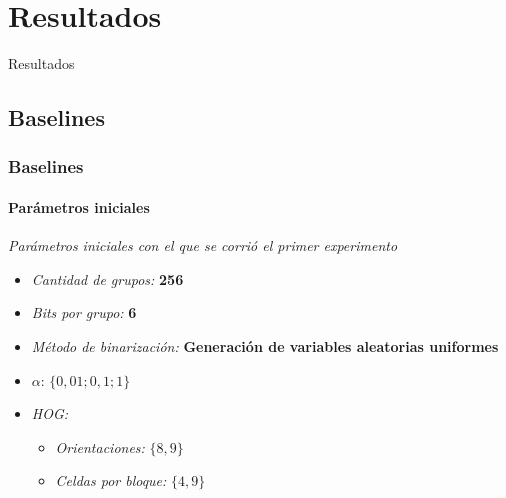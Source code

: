 \section{Resultados}
	\begin{frame}
		\begin{center}
			\begin{huge}
				{Resultados}
			\end{huge}
		\end{center}
	\end{frame}
	\subsection{Baselines}
		\begin{frame}
			\frametitle{Baselines}
			\framesubtitle{Parámetros iniciales}
			\textit{Parámetros iniciales con el que se corrió el primer experimento}
			\begin{itemize}
				\item<1-> \textit{Cantidad de grupos:} \textbf{256}
				\item<2-> \textit{Bits por grupo:} \textbf{6}
				\item<3-> \textit{Método de binarización:} \textbf{Generación de variables aleatorias uniformes}
				\item<4-> $\alpha$: $\{0,01; 0,1; 1\}$
				\item<5-> \textit{HOG:}
					\begin{itemize}
						\item<6-> \textit{Orientaciones:} $\{8, 9\}$
						\item<7-> \textit{Celdas por bloque:} $\{4, 9\}$
					\end{itemize}
			\end{itemize}
		\end{frame}
